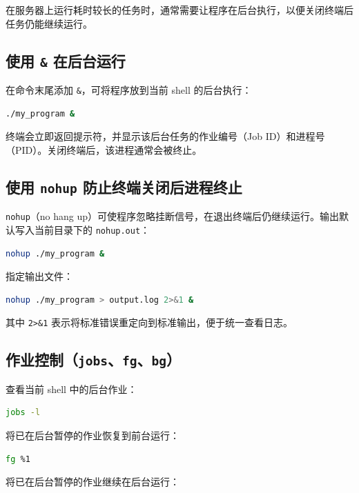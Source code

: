 在服务器上运行耗时较长的任务时，通常需要让程序在后台执行，以便关闭终端后任务仍能继续运行。

\subsection{使用 \texttt{\&} 在后台运行}

在命令末尾添加 \texttt{\&}，可将程序放到当前 shell 的后台执行：

\begin{lstlisting}[language=sh]
./my_program &
\end{lstlisting}

终端会立即返回提示符，并显示该后台任务的作业编号（Job ID）和进程号（PID）。关闭终端后，该进程通常会被终止。

\subsection{使用 \texttt{nohup} 防止终端关闭后进程终止}

\texttt{nohup}（no hang up）可使程序忽略挂断信号，在退出终端后仍继续运行。输出默认写入当前目录下的 \texttt{nohup.out}：

\begin{lstlisting}[language=sh]
nohup ./my_program &
\end{lstlisting}

指定输出文件：

\begin{lstlisting}[language=sh]
nohup ./my_program > output.log 2>&1 &
\end{lstlisting}

其中 \texttt{2>\&1} 表示将标准错误重定向到标准输出，便于统一查看日志。

\subsection{作业控制（\texttt{jobs}、\texttt{fg}、\texttt{bg}）}

查看当前 shell 中的后台作业：

\begin{lstlisting}[language=sh]
jobs -l
\end{lstlisting}

将已在后台暂停的作业恢复到前台运行：

\begin{lstlisting}[language=sh]
fg %1
\end{lstlisting}

将已在后台暂停的作业继续在后台运行：

